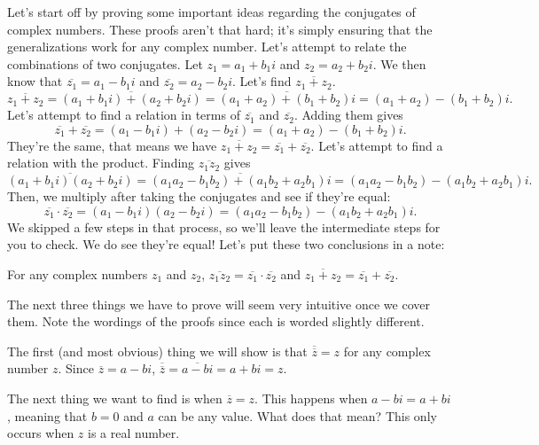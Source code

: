 \documentclass[../book.tex]{subfiles}
\begin{document}
Let's start off by proving some important ideas regarding the conjugates of complex numbers.  These proofs aren't that hard; it's simply ensuring that the generalizations work for any complex number.  Let's attempt to relate the combinations of two conjugates.  Let $z_1=a_1+b_1i$ and $z_2=a_2+b_2i$.  We then know that $\overline{z_1}=a_1-b_1i$ and $\overline{z_2}=a_2-b_2i$.  Let's find $\overline{z_1+z_2}$.  $$\overline{z_1+z_2}=\overline{\left(a_1+b_1i\right)+\left(a_2+b_2i\right)}=\overline{\left(a_1+a_2\right)+\left(b_1+b_2\right)i}=\left(a_1+a_2\right)-\left(b_1+b_2\right)i.$$
Let's attempt to find a relation in terms of $\overline{z_1}$ and $\overline{z_2}$.  Adding them gives $$\overline{z_1}+\overline{z_2}=\left(a_1-b_1i\right)+\left(a_2-b_2i\right)=\left(a_1+a_2\right)-\left(b_1+b_2\right)i.$$  They're the same, that means we have $\overline{z_1+z_2}=\overline{z_1}+\overline{z_2}$.  Let's attempt to find a relation with the product.  Finding $\overline{z_1z_2}$ gives $$\overline{\left(a_1+b_1i\right)\left(a_2+b_2i\right)}=\overline{\left(a_1a_2-b_1b_2\right)+\left(a_1b_2+a_2b_1\right)i}=\left(a_1a_2-b_1b_2\right)-\left(a_1b_2+a_2b_1\right)i.$$
Then, we multiply after taking the conjugates and see if they're equal:
$$\overline{z_1}\cdot\overline{z_2}=\left(a_1-b_1i\right)\left(a_2-b_2i\right)=\left(a_1a_2-b_1b_2\right)-\left(a_1b_2+a_2b_1\right)i.$$
We skipped a few steps in that process, so we'll leave the intermediate steps for you to check.  We do see they're equal!  Let's put these two conclusions in a note:
\begin{note}
For any complex numbers $z_1$ and $z_2$, $\overline{z_1z_2}=\overline{z_1}\cdot \overline{z_2}$ and $\overline{z_1+z_2}=\overline{z_1}+\overline{z_2}$.
\end{note}

The next three things we have to prove will seem very intuitive once we cover them.  Note the wordings of the proofs since each is worded slightly different.

The first (and most obvious) thing we will show is that $\overline{\overline{z}}=z$ for any complex number $z$.  Since $\overline{z}=a-bi$, $\overline{\overline{z}}=\overline{a-bi}=a+bi=z$.  

The next thing we want to find is when $\overline{z}=z$.  This happens when $a-bi=a+bi$, meaning that $b=0$ and $a$ can be any value.  What does that mean?  This only occurs when $z$ is a real number.
\end{document}
